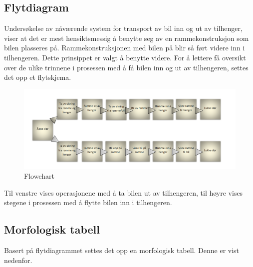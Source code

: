 \subsection{Flytdiagram}
\begin{flushleft}
Undersøkelse av nåværende system for transport av bil inn og ut av tilhenger, viser at det er mest hensiktsmessig å benytte seg av en rammekonstruksjon som bilen plasseres på. Rammekonstruksjonen med bilen på blir så ført videre inn i tilhengeren. Dette prinsippet er valgt å benytte videre. For å lettere få oversikt over de ulike trinnene i prosessen med å få bilen inn og ut av tilhengeren, settes det opp et flytskjema.
\end{flushleft}

\begin{figure}[H]
\begin{center}
\leavevmode
\includegraphics[width=\textwidth]{images/Bildet_3}
\end{center}
\caption{Flowchart}
\label{fig:flowchart}
\end{figure}

\begin{flushleft}
Til venstre vises operasjonene med å ta bilen ut av tilhengeren, til høyre vises stegene i prosessen med å flytte bilen inn i tilhengeren.\newpage

\subsection{Morfologisk tabell}
Basert på flytdiagrammet settes det opp en morfologisk tabell. Denne er vist nedenfor.
\end{flushleft}

